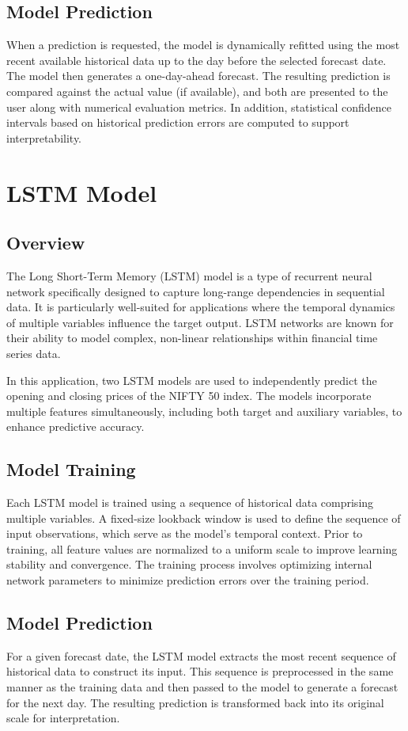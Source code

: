 \subsection{Model Prediction}
When a prediction is requested, the model is dynamically refitted using the most recent available historical data up to the day before the selected forecast date. The model then generates a one-day-ahead forecast. The resulting prediction is compared against the actual value (if available), and both are presented to the user along with numerical evaluation metrics. In addition, statistical confidence intervals based on historical prediction errors are computed to support interpretability.

\section{LSTM Model}

\subsection{Overview}
The Long Short-Term Memory (LSTM) model is a type of recurrent neural network specifically designed to capture long-range dependencies in sequential data. It is particularly well-suited for applications where the temporal dynamics of multiple variables influence the target output. LSTM networks are known for their ability to model complex, non-linear relationships within financial time series data.

In this application, two LSTM models are used to independently predict the opening and closing prices of the NIFTY 50 index. The models incorporate multiple features simultaneously, including both target and auxiliary variables, to enhance predictive accuracy.

\subsection{Model Training}
Each LSTM model is trained using a sequence of historical data comprising multiple variables. A fixed-size lookback window is used to define the sequence of input observations, which serve as the model's temporal context. Prior to training, all feature values are normalized to a uniform scale to improve learning stability and convergence. The training process involves optimizing internal network parameters to minimize prediction errors over the training period.

\subsection{Model Prediction}
For a given forecast date, the LSTM model extracts the most recent sequence of historical data to construct its input. This sequence is preprocessed in the same manner as the training data and then passed to the model to generate a forecast for the next day. The resulting prediction is transformed back into its original scale for interpretation.

